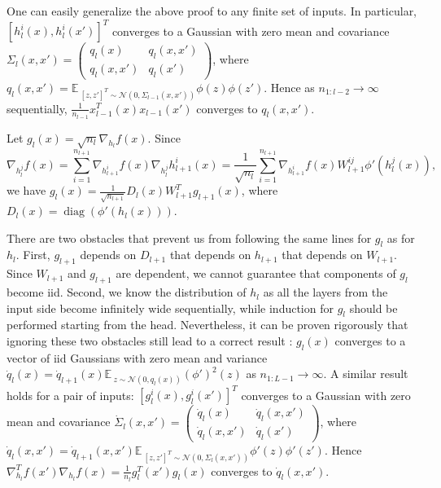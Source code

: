 \documentclass{article}
\newcommand{\EE}{\mathbb{E}\,}
\newcommand{\NN}{\mathcal{N}}
\DeclareMathOperator*{\diag}{diag}
\begin{document}
    One can easily generalize the above proof to any finite set of inputs.
    In particular, $[h_l^i(x),h_l^i(x')]^T$ converges to a Gaussian with zero mean and covariance $\Sigma_l(x,x') = \begin{pmatrix} q_l(x) & q_l(x,x')\\q_l(x,x') & q_l(x') \end{pmatrix}$, where $q_l(x,x') = \EE_{[z,z']^T \sim \NN(0,\Sigma_{l-1}(x,x'))} \phi(z) \phi(z')$.
    Hence as $n_{1:l-2} \to \infty$ sequentially, $\frac{1}{n_{l-1}} x_{l-1}^T(x) x_{l-1}(x')$ converges to $q_l(x,x')$.

    Let $g_l(x) = \sqrt{n_l} \nabla_{h_l} f(x)$.
    Since
    \begin{equation}
        \nabla_{h_l^j} f(x) 
        = \sum_{i=1}^{n_{l+1}} \nabla_{h_{l+1}^i} f(x) \nabla_{h_l^j} h_{l+1}^i(x) 
        = \frac{1}{\sqrt{n_l}} \sum_{i=1}^{n_{l+1}} \nabla_{h_{l+1}^i} f(x) W_{l+1}^{ij} \phi'(h_l^j(x)),
    \end{equation}
    we have $g_l(x) = \frac{1}{\sqrt{n_{l+1}}} D_l(x) W_{l+1}^T g_{l+1}(x)$, where $D_l(x) = \diag(\phi'(h_l(x)))$.

    There are two obstacles that prevent us from following the same lines for $g_l$ as for $h_l$.
    First, $g_{l+1}$ depends on $D_{l+1}$ that depends on $h_{l+1}$ that depends on $W_{l+1}$.
    Since $W_{l+1}$ and $g_{l+1}$ are dependent, we cannot guarantee that components of $g_l$ become iid.
    Second, we know the distribution of $h_l$ as all the layers from the input side become infinitely wide sequentially, while induction for $g_l$ should be performed starting from the head.
    Nevertheless, it can be proven rigorously that ignoring these two obstacles still lead to a correct result \cite{yang2020tensor_ii}: $g_l(x)$ converges to a vector of iid Gaussians with zero mean and variance $\dot q_l(x) = \dot q_{l+1}(x) \EE_{z \sim \NN(0,q_l(x))} (\phi')^2(z)$ as $n_{1:L-1} \to \infty$.
    A similar result holds for a pair of inputs: $[g_l^i(x),g_l^i(x')]^T$ converges to a Gaussian with zero mean and covariance $\dot\Sigma_l(x,x') = \begin{pmatrix} \dot q_l(x) & \dot q_l(x,x')\\\dot q_l(x,x') & \dot q_l(x') \end{pmatrix}$, where $\dot q_l(x,x') = \dot q_{l+1}(x,x') \EE_{[z,z']^T \sim \NN(0,\Sigma_l(x,x'))} \phi'(z) \phi'(z')$.
    Hence $\nabla^T_{h_l} f(x') \nabla_{h_l} f(x) = \frac{1}{n_l} g_l^T(x') g_l(x)$ converges to $\dot q_l(x,x')$.
\end{document}
